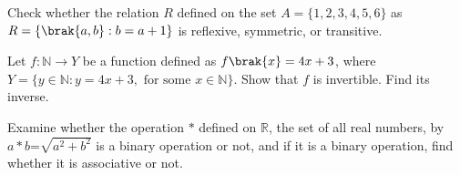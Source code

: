 \item Check whether the relation $R$ defined on the set $A=\{1,2,3,4,5,6\}$ as $R = \{\brak{a, b} : b = a + 1\}$ is reflexive, symmetric, or transitive.
\item Let $f : \mathbb{N} \rightarrow Y$ be a function defined as $f\brak{x} = 4x + 3$,
where $Y = \{y \in \mathbb{N} : y = 4x + 3, \text{ for some } x \in \mathbb{N}\}$. Show that $f$ is invertible. Find its inverse.
\item Examine whether the operation $*$ defined on $\mathbb{R}$, the set of all real numbers, by $a*b$=${\sqrt{a^2 + b^2}}$ is a binary operation or not, and if it is a binary operation, find whether it is associative or not.

